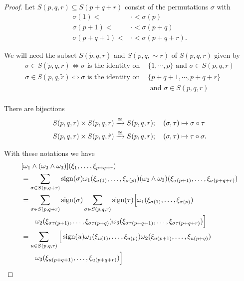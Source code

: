 \begin{proof}
  Let $S(p, q, r)\subseteq S(p+q+r)$ consist of the permutations $\sigma$ with
  \begin{align*}
    \sigma(1) <     & \cdot < \sigma(p)      \\
    \sigma(p+1) <   & \cdot < \sigma(p+q)    \\
    \sigma(p+q+1) < & \cdot < \sigma(p+q+r).
  \end{align*}

  We will need the subset $S(\tilde{p}, q, r)$ and $S(p, q, \sim{r})$ of $S(p, q, r)$ given by
  \begin{align*}
  \sigma \in S(\tilde{p}, q, r) \Longleftrightarrow \sigma \text{ is the identity on }  & \{1, \cdots, p\} \text{ and } \sigma\in S(p, q, r) \\
  \sigma \in S(p, q, \tilde{r}) \Longleftrightarrow \sigma \text{ is the identity on }  & \{p+q+1, \cdots, p+q+r\}                           \\
                                                                                        & \text{ and } \sigma\in S(p, q, r)                  \\
  \end{align*}

  There are bijections
  \begin{align}\label{eq:2-2}
    \begin{aligned}
      S(p, q, r) \times S(p, q, r)         & \xrightarrow[]{\cong} S(p, q, r); \quad (\sigma, \tau)\mapsto\sigma\circ\tau   \\
      S(p, q, r) \times S(p, q, \tilde{r}) & \xrightarrow[]{\cong} S(p, q, r); \quad (\sigma, \tau)\mapsto\tau\circ\sigma.
    \end{aligned}
  \end{align}

  With these notations we have
  \begin{align*}
    & [\omega_1\wedge(\omega_2\wedge\omega_3)](\xi_1,\ldots,\xi_{p+q+r})                                                                              \\
    & = \sum_{\sigma\in S(p,q+r)}\operatorname{sign}(\sigma)\omega_1(\xi_{\sigma(1)},\ldots,\xi_{\sigma(p)})
    (\omega_2\wedge\omega_3)(\xi_{\sigma(p+1)},\ldots,\xi_{\sigma(p+q+r)})                                                                             \\
    & = \sum_{\sigma\in S(p,q+r)}\operatorname{sign}(\sigma)\sum_{\sigma\in S(p,q,r)}\operatorname{sign}(\tau)\Big[\omega_1(\xi_{\sigma(1)},\ldots,\xi_{\sigma(p)})               \\
    & \hspace*{2em} \omega_2(\xi_{\sigma\tau(p+1)},\ldots,\xi_{\sigma\tau(p+q)})\omega_3(\xi_{\sigma\tau(p+q+1)},\ldots,\xi_{\sigma\tau(p+q+r)})\Big] \\
    & = \sum_{u\in S(p,q,r)}\Big[\operatorname{sign}(u)\omega_1(\xi_{u(1)},\ldots,\xi_{u(p)})\omega_2(\xi_{u(p+1)},\ldots,\xi_{u(p+q)})                             \\
    & \hspace*{2em} \omega_3(\xi_{u(p+q+1)},\ldots,\xi_{u(p+q+r)})\Big]
  \end{align*}


\end{proof}
